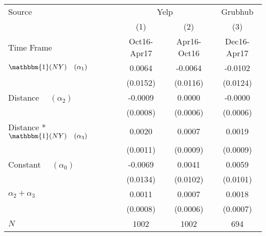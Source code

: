 \begin{center}
\begin{tabular}{lccc}
\hline Source & \multicolumn{2}{c}{Yelp} & Grubhub\\
 & (1) & (2) & (3)\\
Time Frame & Oct16-Apr17 & Apr16-Oct16 & Dec16-Apr17\\
\hline  $ \mathbbm{1}(NY) \quad (\alpha_1) $  & 0.0064 & -0.0064 & -0.0102\\
  & (0.0152) & (0.0116) & (0.0124)\\
 Distance $\quad (\alpha_2) $  & -0.0009 & 0.0000 & -0.0000\\
  & (0.0008) & (0.0006) & (0.0006)\\
 Distance * $ \mathbbm{1}(NY) \quad (\alpha_3) $  & 0.0020 & 0.0007 & 0.0019\\
  & (0.0011) & (0.0009) & (0.0009)\\
 Constant $\quad (\alpha_0) $  & -0.0069 & 0.0041 & 0.0059\\
  & (0.0134) & (0.0102) & (0.0101)\\
\hline  $ \alpha_2 + \alpha_3 $  & 0.0011 & 0.0007 & 0.0018\\
  & (0.0008) & (0.0006) & (0.0007)\\
\hline  $ N $  & 1002 & 1002 & 694\\
\hline\end{tabular}\\
\end{center}
